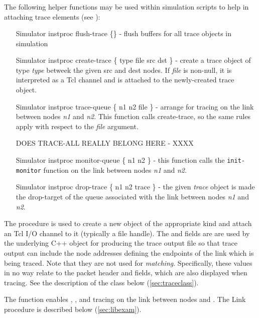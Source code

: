 \subsubsection{}
The following helper functions may be used within simulation
scripts to help in attaching trace elements (see ):
\begin{small}
\begin{itemize}
\item[Simulator instproc flush-trace \{\}] - flush buffers for all
trace objects in simulation
\item[Simulator instproc create-trace \{ type file src dst \}] - create a
trace object of type {\em type} betweek the given src and dest nodes.
If {\em file} is non-null, it is interpreted as a Tcl channel and is
attached to the newly-created trace object.
\item[Simulator instproc trace-queue \{ n1 n2 file \}] - arrange for
tracing on the link between nodes {\em n1} and {\em n2}.  This function
calls create-trace, so the same rules apply with respect to the {\em file}
argument.
\item[DOES TRACE-ALL REALLY BELONG HERE] - XXXX
\item[Simulator instproc monitor-queue \{ n1 n2 \}] - this function
calls the {\tt init-monitor} function on the link between nodes {\em n1}
and {\em n2}.
\item[Simulator instproc drop-trace \{ n1 n2 trace \}] - the given {\em trace}
object is made the drop-target of the queue associated with the link
between nodes {\em n1} and {\em n2}.
\end{itemize}
\end{small}
The  procedure is used to create a new 
object of the appropriate kind and attach an Tcl I/O channel to it
(typically a file handle).
The  and  fields are are used by the underlying C++
object for producing the trace output file so that trace output
can include the node addresses defining the endpoints of the link which
is being traced.
Note that they are not used for {\em matching}.  Specifically, these
values in no way relate to the packet header  and 
fields, which are also displayed when tracing.
See the description of the 
class below (\ref{sec:traceclass}).

The  function enables
, , and  tracing on the link
between nodes  and .
The Link  procedure is described below (\ref{sec:libexam}).

